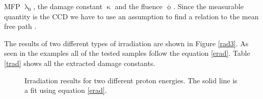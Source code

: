\noindent
\ac{MFP} $\uplambda_0$, the damage constant $\upkappa$ and the fluence $\upphi$. Since the measurable quantity is the \ac{CCD} we have to use an assumption to find a relation to the mean free path \cite{felix}.\par
The results of two different types of irradiation are shown in Figure \vref{rad3}. As seen in the examples all of the tested samples follow the equation \vref{erad}. Table \vref{trad} shows all the extracted damage constants.

\begin{figure}
	\centering
	\caption{Irradiation results for two different proton energies. The solid line is a fit using equation \vref{erad}.}
	\label{rad3}
\end{figure}


